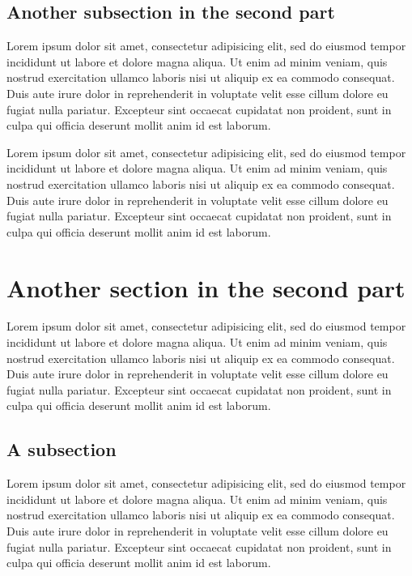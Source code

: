 \documentclass[9pt,english]{Beamer_PROMES}\uselanguage{English}\languagepath{English}
\begin{document}
\subsection{Another subsection in the second part}
\begin{frame}

Lorem ipsum dolor sit amet, consectetur adipisicing elit, sed do eiusmod tempor incididunt ut labore et dolore magna aliqua. Ut enim ad minim veniam, quis nostrud exercitation ullamco laboris nisi ut aliquip ex ea commodo consequat. Duis aute irure dolor in reprehenderit in voluptate velit esse cillum dolore eu fugiat nulla pariatur. Excepteur sint occaecat cupidatat non proident, sunt in culpa qui officia deserunt mollit anim id est laborum.

\end{frame}
\begin{frame}

Lorem ipsum dolor sit amet, consectetur adipisicing elit, sed do eiusmod tempor incididunt ut labore et dolore magna aliqua. Ut enim ad minim veniam, quis nostrud exercitation ullamco laboris nisi ut aliquip ex ea commodo consequat. Duis aute irure dolor in reprehenderit in voluptate velit esse cillum dolore eu fugiat nulla pariatur. Excepteur sint occaecat cupidatat non proident, sunt in culpa qui officia deserunt mollit anim id est laborum.

\end{frame}
\section{Another section in the second part}
\begin{frame}

Lorem ipsum dolor sit amet, consectetur adipisicing elit, sed do eiusmod tempor incididunt ut labore et dolore magna aliqua. Ut enim ad minim veniam, quis nostrud exercitation ullamco laboris nisi ut aliquip ex ea commodo consequat. Duis aute irure dolor in reprehenderit in voluptate velit esse cillum dolore eu fugiat nulla pariatur. Excepteur sint occaecat cupidatat non proident, sunt in culpa qui officia deserunt mollit anim id est laborum.

\end{frame}
\subsection{A subsection}
\begin{frame}

Lorem ipsum dolor sit amet, consectetur adipisicing elit, sed do eiusmod tempor incididunt ut labore et dolore magna aliqua. Ut enim ad minim veniam, quis nostrud exercitation ullamco laboris nisi ut aliquip ex ea commodo consequat. Duis aute irure dolor in reprehenderit in voluptate velit esse cillum dolore eu fugiat nulla pariatur. Excepteur sint occaecat cupidatat non proident, sunt in culpa qui officia deserunt mollit anim id est laborum.

\end{frame}
\end{document}

